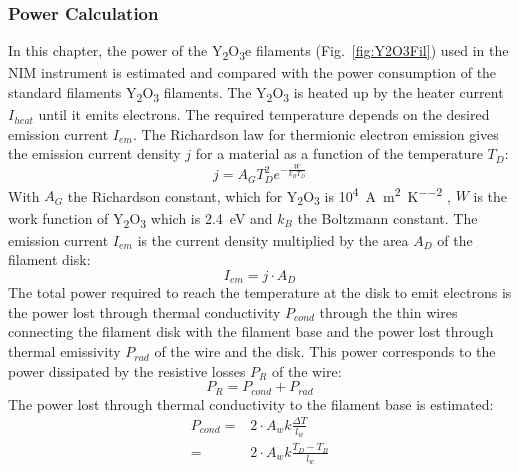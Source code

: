 		\subsubsection{Power Calculation}
		In this chapter, the power of the Y\textsubscript{2}O\textsubscript{3}e filaments (Fig.~\ref{fig:Y2O3Fil}) used in the NIM instrument is estimated and compared with the power consumption of the standard filaments Y\textsubscript{2}O\textsubscript{3} filaments.
		The Y\textsubscript{2}O\textsubscript{3} is heated up by the heater current $I_{heat}$ until it emits electrons. The required temperature depends on the desired emission current $I_{em}$. The Richardson law for thermionic electron emission gives the emission current density $j$ for a material as a function of the temperature $T_D$:
		\begin{equation}
			j = A_GT_D^2e^{-\frac{W}{k_BT_D}}
			\label{eq:Richardson}
		\end{equation} %
		With $A_G$ the Richardson constant, which for Y\textsubscript{2}O\textsubscript{3} is 10\textsuperscript{4}~\si{\ampere\per\square\meter\per\square\kelvin} \cite{MaterHandbookCardaelli}, $W$ is the work function of Y\textsubscript{2}O\textsubscript{3} which is 2.4~eV \cite{MaterHandbookCardaelli} and $k_B$ the Boltzmann constant. The emission current $I_{em}$ is the current density multiplied by the area $A_{D}$ of the filament disk:
		\begin{equation}
			I_{em} = j\cdot A_{D}
		\end{equation}
		The total power required to reach the temperature at the disk to emit electrons is the power lost through thermal conductivity $P_{cond}$ through the thin wires connecting the filament disk with the filament base and the power lost through thermal emissivity $P_{rad}$ of the wire and the disk. This power corresponds to the power dissipated by the resistive losses $P_{R}$ of the wire:
		\begin{equation}
			P_{R} = P_{cond} + P_{rad}
		\end{equation}
		The power lost through thermal conductivity to the filament base is estimated:
		\begin{align}
			P_{cond} =& 2\cdot A_{w}k\frac{\Delta T}{l_{w}} \\
					 =& 2\cdot A_{w}k\frac{T_D - T_B}{l_{w}}
		\end{align}
